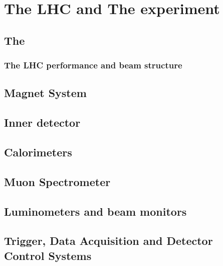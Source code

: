 \chapter{The LHC and The \ATLAS experiment}
\label{chap:MoreStuff}

\section{The \LHC}
\subsection{The LHC performance and beam structure}
\section{Magnet System}
\section{Inner detector}
\section{Calorimeters}
\section{Muon Spectrometer}
\section{Luminometers and beam monitors}
\section{Trigger, Data Acquisition and Detector Control Systems}

